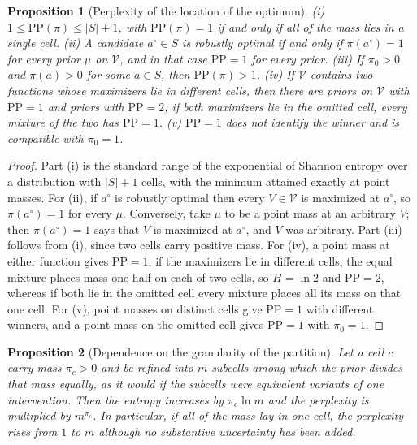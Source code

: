 \documentclass[11pt]{article}
\newtheorem{proposition}{Proposition}
\theoremstyle{definition}
\theoremstyle{remark}
\begin{document}
\begin{proposition}[Perplexity of the location of the optimum]
\label{prop:pp}
(i) $1\le\mathrm{PP}(\pi)\le|S|+1$, with $\mathrm{PP}(\pi)=1$ if and only if all of the mass lies in a single cell. (ii) A candidate $a^{\circ}\in S$ is robustly optimal if and only if $\pi(a^{\circ})=1$ for every prior $\mu$ on $\mathcal V$, and in that case $\mathrm{PP}=1$ for every prior. (iii) If $\pi_0>0$ and $\pi(a)>0$ for some $a\in S$, then $\mathrm{PP}(\pi)>1$. (iv) If $\mathcal V$ contains two functions whose maximizers lie in different cells, then there are priors on $\mathcal V$ with $\mathrm{PP}=1$ and priors with $\mathrm{PP}=2$; if both maximizers lie in the omitted cell, every mixture of the two has $\mathrm{PP}=1$. (v) $\mathrm{PP}=1$ does not identify the winner and is compatible with $\pi_0=1$.
\end{proposition}

\begin{proof}
Part (i) is the standard range of the exponential of Shannon entropy over a distribution with $|S|+1$ cells, with the minimum attained exactly at point masses. For (ii), if $a^{\circ}$ is robustly optimal then every $V\in\mathcal V$ is maximized at $a^{\circ}$, so $\pi(a^{\circ})=1$ for every $\mu$. Conversely, take $\mu$ to be a point mass at an arbitrary $V$; then $\pi(a^{\circ})=1$ says that $V$ is maximized at $a^{\circ}$, and $V$ was arbitrary. Part (iii) follows from (i), since two cells carry positive mass. For (iv), a point mass at either function gives $\mathrm{PP}=1$; if the maximizers lie in different cells, the equal mixture places mass one half on each of two cells, so $H=\ln2$ and $\mathrm{PP}=2$, whereas if both lie in the omitted cell every mixture places all its mass on that one cell. For (v), point masses on distinct cells give $\mathrm{PP}=1$ with different winners, and a point mass on the omitted cell gives $\mathrm{PP}=1$ with $\pi_0=1$.
\end{proof}

\begin{proposition}[Dependence on the granularity of the partition]
\label{prop:refine}
Let a cell $c$ carry mass $\pi_c>0$ and be refined into $m$ subcells among which the prior divides that mass equally, as it would if the subcells were equivalent variants of one intervention. Then the entropy increases by $\pi_c\ln m$ and the perplexity is multiplied by $m^{\pi_c}$. In particular, if all of the mass lay in one cell, the perplexity rises from $1$ to $m$ although no substantive uncertainty has been added.
\end{proposition}
\end{document}
